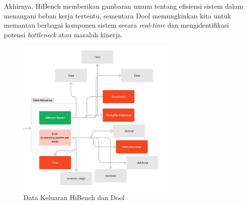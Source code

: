 Akhirnya, HiBench memberikan gambaran umum tentang efisiensi sistem dalam menangani beban kerja tertentu, sementara Dool memungkinkan kita untuk memantau berbagai komponen sistem secara\textit{ real-time} dan mengidentifikasi potensi \textit{bottleneck} atau masalah kinerja.

\begin{figure}[h]
    \centering
    \includegraphics[width=0.7\textwidth]{figures/ch02/output-hibench-dool.png}
    \caption{Data Keluaran HiBench dan Dool}
    \label{fig:output-hibench-dool}
\end{figure}
